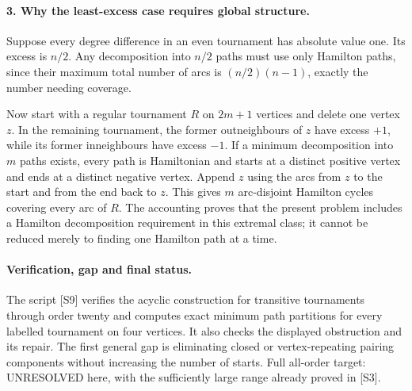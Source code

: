 \documentclass[11pt,a4paper]{article}
\begin{document}
\paragraph{3. Why the least-excess case requires global structure.}
Suppose every degree difference in an even tournament has absolute
value one. Its excess is $n/2$. Any decomposition into $n/2$ paths
must use only Hamilton paths, since their maximum total number of
arcs is $(n/2)(n-1)$, exactly the number needing coverage.

Now start with a regular tournament $R$ on $2m+1$ vertices and delete
one vertex $z$. In the remaining tournament, the former outneighbours
of $z$ have excess $+1$, while its former inneighbours have excess
$-1$. If a minimum decomposition into $m$ paths exists, every path
is Hamiltonian and starts at a distinct positive vertex and ends at
a distinct negative vertex. Append $z$ using the arcs from $z$ to
the start and from the end back to $z$. This gives $m$ arc-disjoint
Hamilton cycles covering every arc of $R$. The accounting proves
that the present problem includes a Hamilton decomposition requirement
in this extremal class; it cannot be reduced merely to finding one
Hamilton path at a time.

\paragraph{Verification, gap and final status.}
The script [S9] verifies the acyclic construction for transitive
tournaments through order twenty and computes exact minimum path
partitions for every labelled tournament on four vertices. It also
checks the displayed obstruction and its repair. The first general
gap is eliminating closed or vertex-repeating pairing components
without increasing the number of starts. Full all-order target:
UNRESOLVED here, with the sufficiently large range already proved
in [S3].
\end{document}
